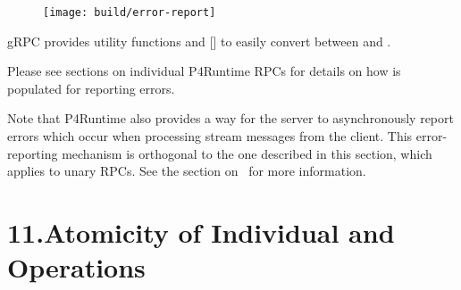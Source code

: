 \documentclass[11pt]{article}
\begin{document}
{%
\begin{figure}[tbp]%
\begin{mdcenter}%

\noindent{}\texttt{[image: build/error-report]}{}%

\mdhr{}%

\noindent{}%
\end{mdcenter}\label{fig-error-report}%
\end{figure}%

\noindent{}gRPC provides utility functions  and 
[] to easily convert between  and
.%

Please see sections on individual P4Runtime RPCs for details on how
 is populated for reporting errors.%

Note that P4Runtime also provides a way for the server to asynchronously report
errors which occur when processing stream messages from the client. This
error-reporting mechanism is orthogonal to the one described in this section,
which applies to unary RPCs. See the section on~ for more information.%

\section{11.\hspace*{0.5em}Atomicity of Individual  and  Operations}\label{sec-atomicity-of-individual-write-and-read-operations}%

}
\end{document}
